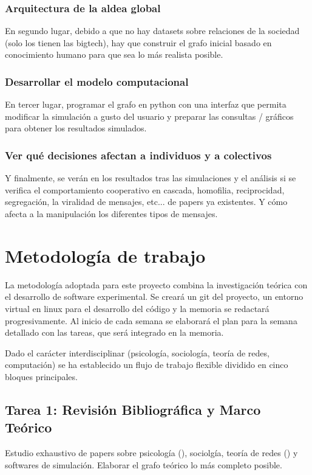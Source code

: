 \documentclass[12pt]{extarticle}
\numberwithin{equation}{section}
\begin{document}
\subsubsection{Arquitectura de la aldea global}
En segundo lugar, debido a que no hay datasets sobre relaciones de la sociedad (solo los tienen las bigtech), hay que construir el grafo inicial basado en conocimiento humano para que sea lo más realista posible.

\subsubsection{Desarrollar el modelo computacional}
En tercer lugar, programar el grafo en python con una interfaz que permita modificar la simulación a gusto del usuario y preparar las consultas / gráficos para obtener los resultados simulados.

\subsubsection{Ver qué decisiones afectan a individuos y a colectivos}
Y finalmente, se verán en los resultados tras las simulaciones y el análisis si se verifica el comportamiento cooperativo en cascada, homofilia, reciprocidad, segregación, la viralidad de mensajes, etc... de papers ya existentes. Y cómo afecta a la manipulación los diferentes tipos de mensajes.

\newpage

\section{Metodología de trabajo}\label{sec:methodology}
La metodología adoptada para este proyecto combina la investigación teórica con el desarrollo de software experimental. Se creará un git del proyecto, un entorno virtual en linux para el desarrollo del código y la memoria se redactará progresivamente. Al inicio de cada semana se elaborará el plan para la semana detallado con las tareas, que será integrado en la memoria.

Dado el carácter interdisciplinar (psicología, sociología, teoría de redes, computación) se ha establecido un flujo de trabajo flexible dividido en cinco bloques principales.

\subsection{Tarea 1: Revisión Bibliográfica y Marco Teórico}
Estudio exhaustivo de papers sobre psicología (\cite{InstitutoTavistock2011}), sociolgía, teoría de redes (\cite{EasleyKleinberg2010}) y softwares de simulación. Elaborar el grafo teórico lo más completo posible.
\end{document}
